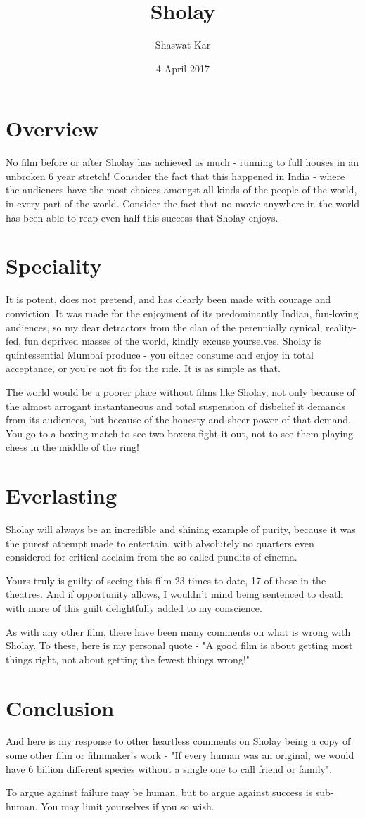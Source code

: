\documentclass[a4paper,12pt]{article}
\title{Sholay}
\author{Shaswat Kar }
\date{4 April 2017}
\begin{document}
\section{Overview}

No film before or after Sholay has achieved as much - running to full houses in an unbroken 6 year stretch! Consider the fact that this happened in India - where the audiences have the most choices amongst all kinds of the people of the world, in every part of the world. Consider the fact that no movie anywhere in the world has been able to reap even half this success that Sholay enjoys.

\section{Speciality}

It is potent, does not pretend, and has clearly been made with courage and conviction. It was made for the enjoyment of its predominantly Indian, fun-loving audiences, so my dear detractors from the clan of the perennially cynical, reality-fed, fun deprived masses of the world, kindly excuse yourselves. Sholay is quintessential Mumbai produce - you either consume and enjoy in total acceptance, or you're not fit for the ride. It is as simple as that.

The world would be a poorer place without films like Sholay, not only because of the almost arrogant instantaneous and total suspension of disbelief it demands from its audiences, but because of the honesty and sheer power of that demand. You go to a boxing match to see two boxers fight it out, not to see them playing chess in the middle of the ring!

\section{Everlasting}

Sholay will always be an incredible and shining example of purity, because it was the purest attempt made to entertain, with absolutely no quarters even considered for critical acclaim from the so called pundits of cinema.

Yours truly is guilty of seeing this film 23 times to date, 17 of these in the theatres. And if opportunity allows, I wouldn't mind being sentenced to death with more of this guilt delightfully added to my conscience.

As with any other film, there have been many comments on what is wrong with Sholay. To these, here is my personal quote - "A good film is about getting most things right, not about getting the fewest things wrong!"

\section{Conclusion}

And here is my response to other heartless comments on Sholay being a copy of some other film or filmmaker's work - "If every human was an original, we would have 6 billion different species without a single one to call friend or family".

To argue against failure may be human, but to argue against success is sub-human. You may limit yourselves if you so wish.
\end{document}
